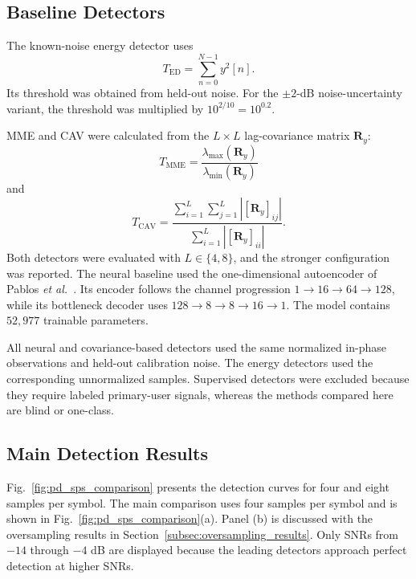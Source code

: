 \documentclass[conference]{IEEEtran}
\begin{document}
\subsection{Baseline Detectors}
\label{subsec:baseline_detectors}

The known-noise energy detector uses
\begin{equation}
T_{\mathrm{ED}}
=
\sum_{n=0}^{N-1}y^2[n].
\label{eq:ed_statistic_results}
\end{equation}
Its threshold was obtained from held-out noise. For the $\pm2$-dB
noise-uncertainty variant, the threshold was multiplied by
$10^{2/10}=10^{0.2}$.

MME and CAV were calculated from the $L\times L$ lag-covariance matrix
$\mathbf{R}_y$:
\begin{equation}
T_{\mathrm{MME}}
=
\frac{\lambda_{\max}(\mathbf{R}_y)}
     {\lambda_{\min}(\mathbf{R}_y)}
\label{eq:mme_statistic_results}
\end{equation}
and
\begin{equation}
T_{\mathrm{CAV}}
=
\frac{\sum_{i=1}^{L}\sum_{j=1}^{L}
\left|[\mathbf{R}_y]_{ij}\right|}
{\sum_{i=1}^{L}\left|[\mathbf{R}_y]_{ii}\right|}.
\label{eq:cav_statistic_results}
\end{equation}
Both detectors were evaluated with $L\in\{4,8\}$, and the stronger
configuration was reported. The neural baseline used the
one-dimensional autoencoder of Pablos \emph{et al.}~\cite{b2}. Its
encoder follows the channel progression
$1\rightarrow16\rightarrow64\rightarrow128$, while its bottleneck
decoder uses
$128\rightarrow8\rightarrow8\rightarrow16\rightarrow1$. The model
contains $52{,}977$ trainable parameters.

All neural and covariance-based detectors used the same normalized
in-phase observations and held-out calibration noise. The energy
detectors used the corresponding unnormalized samples. Supervised
detectors were excluded because they require labeled primary-user
signals, whereas the methods compared here are blind or one-class.

\subsection{Main Detection Results}
\label{subsec:main_detection_results}
Fig.~\ref{fig:pd_sps_comparison} presents the detection curves for four
and eight samples per symbol. The main comparison uses four samples per
symbol and is shown in Fig.~\ref{fig:pd_sps_comparison}(a). Panel (b)
is discussed with the oversampling results in
Section~\ref{subsec:oversampling_results}. Only SNRs from $-14$ through
$-4$ dB are displayed because the leading detectors approach perfect
detection at higher SNRs.
\end{document}
